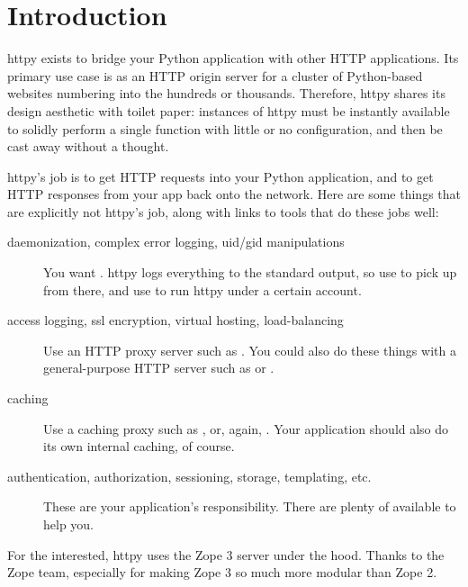 \chapter{Introduction}

httpy exists to bridge your Python application with other HTTP applications. Its
primary use case is as an HTTP origin server for a cluster of Python-based
websites numbering into the hundreds or thousands. Therefore, httpy shares its
design aesthetic with toilet paper: instances of httpy must be instantly
available to solidly perform a single function with little or no configuration,
and then be cast away without a thought.

httpy's job is to get HTTP requests into your Python application, and to get
HTTP responses from your app back onto the network. Here are some things that
are explicitly not httpy's job, along with links to tools that do these jobs
well:

\begin{description}

\item[daemonization, complex error logging, uid/gid manipulations]
    {You want . httpy logs everything to the
    standard output, so use
     to pick up from
    there, and use 
    to run httpy under a certain account.}

\item[access logging, ssl encryption, virtual hosting, load-balancing]
    {Use an HTTP proxy server such as .
    You could also do these things with a general-purpose HTTP server such as
     or
    .}

\item[caching]
    {Use a caching proxy such as , or,
    again, . Your application should
    also do its own internal caching, of course.}

\item[authentication, authorization, sessioning, storage, templating, etc.]
    {These are your application's responsibility. There are plenty of
     available to help
    you.}

\end{description}


For the interested, httpy uses the Zope 3 server under the hood. Thanks to the
Zope team, especially for making Zope 3 so much more modular than Zope 2.
